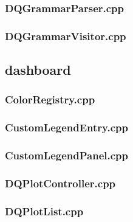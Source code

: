 \subsubsection*{DQGrammarParser.cpp}


\subsubsection*{DQGrammarVisitor.cpp}


\subsection*{dashboard}

\subsubsection*{ColorRegistry.cpp}


\subsubsection*{CustomLegendEntry.cpp}


\subsubsection*{CustomLegendPanel.cpp}


\subsubsection*{DQPlotController.cpp}


\subsubsection*{DQPlotList.cpp}


